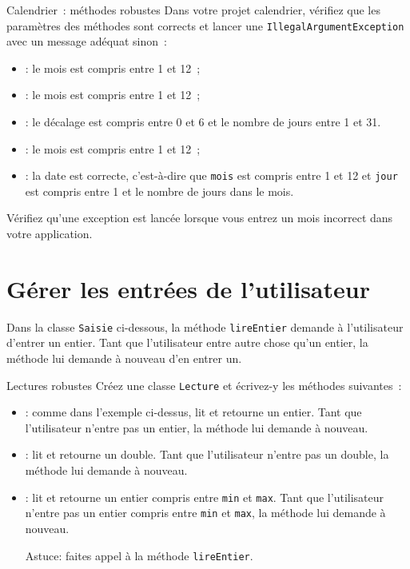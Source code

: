 \documentclass[a4paper,11pt]{article}
\begin{document}
	\begin{Exercice}{Calendrier~: méthodes robustes}
		Dans votre projet calendrier, vérifiez que les paramètres des méthodes sont corrects et lancer une 
		\texttt{IllegalArgumentException} avec un message adéquat sinon~:
		\begin{itemize}
			\item {}: le mois est compris entre 1 et 12~;
			\item {}: le mois est compris entre 1 et 12~;
			\item {}: le décalage est compris entre 0 et 6 et 
				le nombre de jours entre 1 et 31.
			\item  {}: le mois est compris entre 1 et 12~;
			\item {}: la date est correcte, c'est-à-dire 
			que \texttt{mois} est compris entre 1 et 12 et \texttt{jour} est compris entre 1 et le nombre de 
			jours dans le mois. 
		\end{itemize}
		
		Vérifiez qu'une exception est lancée lorsque vous entrez un mois incorrect dans votre application.
	\end{Exercice}

\section{Gérer les entrées de l'utilisateur}

	Dans la classe \texttt{Saisie} ci-dessous, la méthode \texttt{lireEntier} demande à l'utilisateur d'entrer un entier.
	Tant que l'utilisateur entre autre chose qu'un entier, la méthode lui demande à nouveau d'en entrer un. 
	

	
	
	\begin{Exercice}{Lectures robustes}
		Créez une classe \texttt{Lecture} et écrivez-y les méthodes suivantes~:
		\begin{itemize}
			\item {}: comme dans l'exemple ci-dessus, lit et retourne un entier.
				Tant que l'utilisateur n'entre pas un entier, la méthode lui demande à nouveau.
			\item {}: lit et retourne un double.
				Tant que l'utilisateur n'entre pas un double, la méthode lui demande à nouveau.
			\item {}: lit et retourne un entier 
				compris entre \texttt{min} et \texttt{max}.
				Tant que l'utilisateur n'entre pas un entier compris entre \texttt{min} et \texttt{max}, 
				la méthode lui demande à nouveau.
				
				Astuce: faites appel à la méthode \texttt{lireEntier}.
		\end{itemize}
	\end{Exercice}
	
\end{document}
